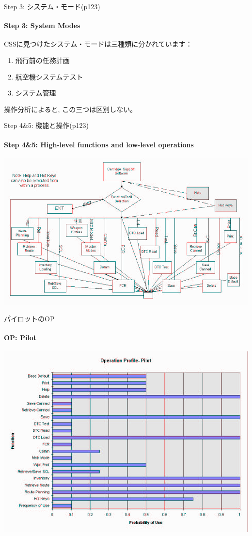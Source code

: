 \begin{frame}{Step 3: システム・モード(p123)}
\framesubtitle{Step 3: System Modes}
CSSに見つけたシステム・モードは三種類に分かれています：
\begin{enumerate}
\item 飛行前の任務計画
\item 航空機システムテスト
\item システム管理
\end{enumerate}
操作分析によると, この三つは区別しない。
\end{frame}
\begin{frame}{Step 4\&5: 機能と操作(p123)}
\framesubtitle{Step 4\&5: High-level functions and low-level operations}
\begin{center}
\includegraphics[width=\textwidth,height=0.7\textheight,keepaspectratio]{figure/CSSflow.png}
\end{center}
\end{frame}
\begin{frame}{パイロットのOP}
\framesubtitle{OP: Pilot}
\begin{center}
\includegraphics[width=\textwidth,height=0.7\textheight,keepaspectratio]{figure/OPpilot.png}
\end{center}
\end{frame}
